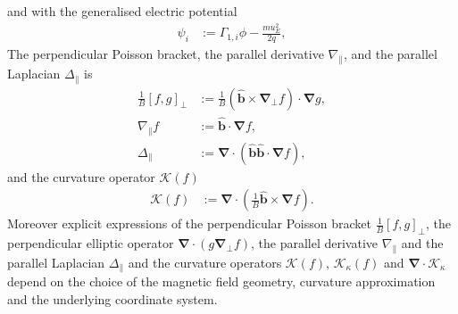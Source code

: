 \documentclass{hitec} %
\renewcommand{\vec}[1]{\boldsymbol{#1}}
\begin{document}
and with the generalised electric potential
\begin{align}
 \psi_i&:= \Gamma_{1,i} \phi - \frac{m u_E^2}{2 q},
\end{align}
The perpendicular Poisson bracket, the parallel derivative \(\nabla_\parallel\), and the parallel Laplacian \(\Delta_\parallel\) is
\begin{align}\label{eq:perppoiss}
 \frac{1}{B}\left[f,g\right]_\perp &:= \frac{1}{B}\left(\vec{\hat{b}} \times \vec{\nabla}_\perp f \right)\cdot \vec{\nabla} g, \\
 \nabla_\parallel f&:= \vec{\hat{b}}\cdot\vec{\nabla} f,  \\
 \Delta_\parallel &:= \vec{\nabla} \cdot ( \vec{\hat{b}} \vec{\hat{b}}\cdot\vec{\nabla} f ),
\end{align}
and the curvature operator \(\mathcal{K}(f)\)
\begin{align}\label{eq:curvopgen}
\mathcal{K}(f)&:=\vec{\nabla} \cdot \left(\frac{1}{B} \vec{\hat{b}} \times \vec{\nabla} f \right).
\end{align}
Moreover explicit expressions of the perpendicular Poisson bracket \( \frac{1}{B}\left[f,g\right]_\perp\), the perpendicular elliptic operator \( \vec{\nabla}\cdot\left(g \vec{\nabla}_\perp f\right)\),
the parallel derivative \(\nabla_\parallel\) and the parallel Laplacian \(\Delta_\parallel\) and  the curvature operators \(\mathcal{K}(f)\),
\(\mathcal{K}_\kappa(f)\) and \(\vec{\nabla} \cdot  \vec{\mathcal{K}}_{\kappa} \)
depend on the choice of the magnetic field geometry, curvature approximation and the underlying coordinate system.
\end{document}

